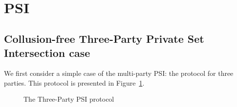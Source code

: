 \section{PSI}
\subsection{Collusion-free Three-Party Private Set Intersection case}
\label{sect:3psi-construction}
We first consider a simple case of the multi-party PSI: the protocol for three parties. This protocol is presented in Figure~\ref{fig:3psi}. 

\begin{figure}[h]\centering
{}
\caption{The Three-Party PSI protocol}
\label{fig:3psi}
\end{figure}
